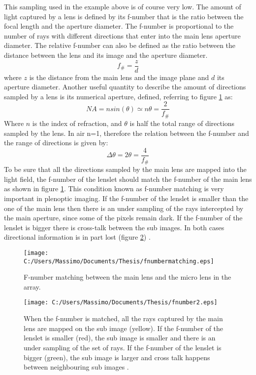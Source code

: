 This sampling used in the example above is of course very low. The amount of light captured by a lens is defined by its f-number that is the ratio between the focal length and the aperture diameter. The f-number is proportional to the number of rays with different directions that enter into the main lens aperture diameter. The relative f-number can also be defined as the ratio between the distance between the lens and its image and the aperture diameter. 
\begin{equation}
\label{eq:f_num}
f_{\#} = \dfrac{z}{d}
\end{equation} 
where $z$ is the distance from the main lens and the image plane and $d$ its aperture diameter. Another useful quantity to describe the amount of directions sampled by a lens is its numerical aperture, defined, referring to figure \ref{fig:plenoptic5} as:
\begin{equation}
\label{eq:NA}
NA=n sin(\theta)\simeq n \theta =\dfrac{2}{f_{\#}}
\end{equation}
Where $n$ is the index of refraction, and $\theta$ is half the total range of directions sampled by the lens. In air n=1, therefore the relation between the f-number and the range of directions is given by:
\begin{equation}
\label{eq:fnum1}
\Delta\theta= 2\theta=\dfrac{4}{f_{\#}}
\end{equation}
 To be sure that all the directions sampled by the main lens are mapped into the light field, the f-number of the lenslet should match the f-number of the main lens \cite{ng2005light} as shown in figure \ref{fig:plenoptic5}. This condition known as f-number matching is very important in plenoptic imaging. If the f-number of the lenslet is smaller than the one of the main lens then there is an under sampling of the rays intercepted by the main aperture, since some of the pixels remain dark. If the f-number of the lenslet is bigger there is cross-talk between the sub images. In both cases directional information is in part lost (figure \ref{fig:plenoptic7}) .
\begin{figure}[H]
	\centering
	\texttt{[image: C:/Users/Massimo/Documents/Thesis/fnumbermatching.eps]}
	\caption{\label{fig:plenoptic5}F-number matching between the main lens and the micro lens in the array.  }
\end{figure}
\begin{figure}[H]
	\centering
	\texttt{[image: C:/Users/Massimo/Documents/Thesis/fnumber2.eps]}
	\caption{\label{fig:plenoptic7}When the f-number is matched, all the rays captured by the main lens are mapped on the sub image (yellow). If the f-number of the lenslet is smaller (red), the sub image is smaller and there is an under sampling of the set of rays. If the f-number of the lenslet is bigger (green), the sub image is larger and cross talk happens between neighbouring sub images .  }
\end{figure}
\newpage
